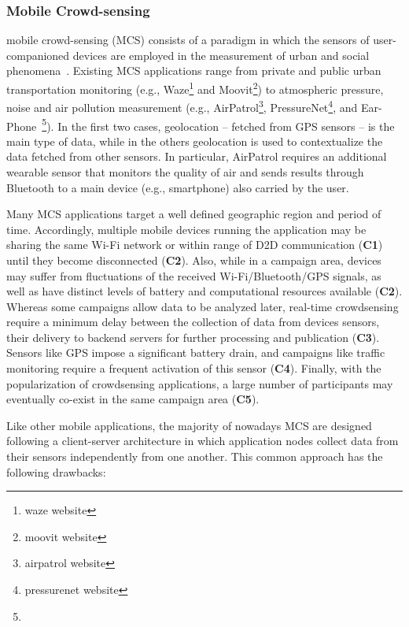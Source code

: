 \subsubsection{Mobile Crowd-sensing}

mobile crowd-sensing (MCS) consists of a paradigm in which the sensors of user-companioned devices are employed in the measurement of urban and social phenomena~\cite{}. Existing MCS applications range from private and public urban transportation monitoring (e.g., Waze\footnote{waze website} and Moovit\footnote{moovit website}) to atmospheric pressure, noise and air pollution measurement (e.g., AirPatrol\footnote{airpatrol website}, PressureNet\footnote{pressurenet website}, and Ear-Phone~\footnote{}). In the first two cases, geolocation -- fetched from GPS sensors -- is the main type of data, while in the others geolocation is used to contextualize the data fetched from other sensors. In particular, AirPatrol requires an additional wearable sensor that monitors the quality of air and sends results through Bluetooth to a main device (e.g., smartphone) also carried by the user.

Many MCS applications target a well defined geographic region and period of time. Accordingly, multiple mobile devices running the application may be sharing the same Wi-Fi network or within range of D2D communication (\textbf{C1}) until they become disconnected (\textbf{C2}). Also, while in a campaign area, devices may suffer from fluctuations of the received Wi-Fi/Bluetooth/GPS signals, as well as have distinct levels of battery and computational resources available (\textbf{C2}).
Whereas some campaigns allow data to be analyzed later, real-time crowdsensing require a minimum delay between the collection of data from devices sensors, their delivery to backend servers for further processing and publication (\textbf{C3}). Sensors like GPS impose a significant battery drain, and campaigns like traffic monitoring require a frequent activation of this sensor (\textbf{C4}). Finally, with the popularization of crowdsensing applications, a large number of participants may eventually co-exist in the same campaign area (\textbf{C5}). 


Like other mobile applications, the majority of nowadays MCS are designed following a client-server architecture in which application nodes collect data from their sensors independently from one another. 
This common approach has the following drawbacks:


